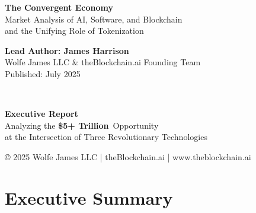 \documentclass[11pt,a4paper]{report}
\newcommand{\marketvalue}[2]{\textcolor{trust}{\textbf{\$#1}}\,\textcolor{darkgray}{#2}}
\begin{document}
\begin{titlepage}
    \begin{center}
        {\Huge\bfseries\color{ocean} The Convergent Economy}\\[0.5cm]
        {\Large\color{sky} Market Analysis of \textcolor{ocean}{AI}, \textcolor{sky}{Software}, and \textcolor{sun}{Blockchain}}\\[0.3cm]
        {\Large\color{trust} and the Unifying Role of \textcolor{sun}{Tokenization}}\\[3cm]
        
        \begin{tcolorbox}[
            width=0.9\textwidth,
            colback=white!95,
            colframe=ocean!50,
            boxrule=1pt,
            arc=5pt,
            boxsep=10pt
        ]
            \centering
            {\large\bfseries\color{ocean} 
             Lead Author: James Harrison}\\[0.2cm]
            {\color{darkgray} 
             Wolfe James LLC \& theBlockchain.ai Founding Team}\\[0.5cm]
            {\color{darkgray} Published: July 2025}
        \end{tcolorbox}
        \\[1cm]
        
        \begin{tcolorbox}[
            width=0.8\textwidth,
            colback=sky!5,
            colframe=ocean,
            boxrule=3pt,
            arc=0pt,
            outer arc=0pt
        ]            \centering\large
            \textbf{Executive Report}\\[0.5cm]
            Analyzing the \marketvalue{5+ Trillion}{} Opportunity\\
            at the Intersection of Three Revolutionary Technologies
        \end{tcolorbox}
        
        \vfill
        
        {\small\color{darkgray} 
         © 2025 Wolfe James LLC | theBlockchain.ai | www.theblockchain.ai
        }
    \end{center}
\end{titlepage}

\tableofcontents

\chapter*{Executive Summary}
\end{document}
